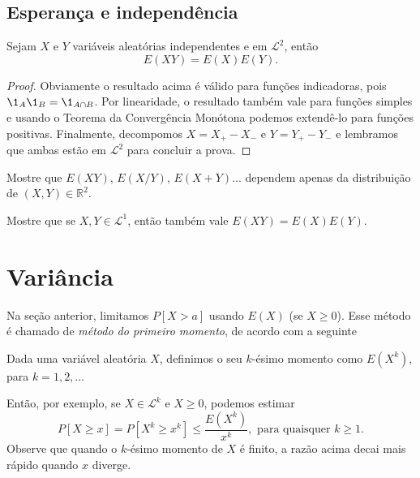 

\subsection{Esperança e independência}

\begin{proposition}
  Sejam $X$ e $Y$ variáveis aleatórias independentes e em $\mathcal{L}^2$, então
  \begin{equation}
    E(XY) = E(X) E(Y).
  \end{equation}
\end{proposition}

\begin{proof}
  Obviamente o resultado acima é válido para funções indicadoras, pois $\1_A \1_B = \1_{A \cap B}$.
  Por linearidade, o resultado também vale para funções simples e usando o Teorema da Convergência Monótona podemos extendê-lo para funções positivas.
  Finalmente, decompomos $X = X_+ - X_-$ e $Y = Y_+ - Y_-$ e lembramos que ambas estão em $\mathcal{L}^2$ para concluir a prova.
\end{proof}

\begin{exercise}
  Mostre que $E(XY)$, $E(X/Y)$, $E(X + Y)$... dependem apenas da distribuição de $(X,Y) \in \mathbb{R}^2$.
\end{exercise}

\begin{exercise}
  Mostre que se $X, Y \in \mathcal{L}^1$, então também vale $E(XY) = E(X) E(Y)$.
\end{exercise}

\section{Variância}

Na seção anterior, limitamos $P[X > a]$ usando $E(X)$ (se $X \geq 0$).
Esse método é chamado de \emph{método do primeiro momento},  de acordo com a seguinte
\begin{definition}
  Dada uma variável aleatória $X$, definimos o seu $k$-ésimo momento como $E(X^k)$, para $k = 1, 2, \dots$
\end{definition}

Então, por exemplo, se $X \in \mathcal{L}^k$ e $X \geq 0$, podemos estimar
\begin{equation}
  P[X \geq x] = P [X^k \geq x^k] \leq \frac{E(X^k)}{x^k}, \text{ para quaisquer $k \geq 1$.}
\end{equation}
Observe que quando o $k$-ésimo momento de $X$ é finito, a razão acima decai mais rápido quando $x$ diverge.

